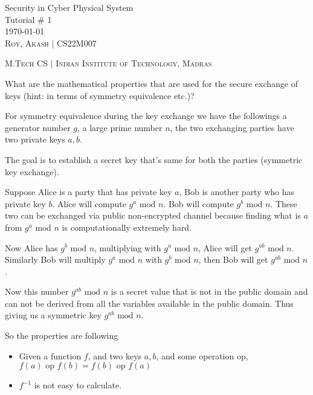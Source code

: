 \documentclass[12pt, a4paper, onecolumn]{exam}
\begin{document}
\begingroup  
    \centering
    \LARGE Security in Cyber Physical System\\
    \LARGE Tutorial \# 1\\[0.5em]
    \large \today\\[0.5em]
    \large \textsc{Roy, Akash} $\mid$ CS22M007\par
    \large \textsc{M.Tech CS} $\mid$ \textsc{Indian Institute of Technology, Madras}\par
\endgroup
\pointsdroppedatright %
\printanswers
\renewcommand{\solutiontitle}{\noindent\textbf{Ans:}\enspace}   %

\begin{questions}

    \question What are the mathematical properties that are used for the secure exchange of keys (hint: in terms of symmetry equivalence etc.)?

    \begin{solution}
        For symmetry equivalence during the key exchange we have the followings a generator number $g$, a large prime number $n$, the two exchanging parties have two private keys $a, b$.

        The goal is to establish a secret key that's same for both the parties (symmetric key exchange).

        Suppose Alice is a party that has private key $a$, Bob is another party who has private key $b$. Alice will compute $g^a \text{ mod } n$. Bob will compute $g^b \text{ mod } n$. These two can be exchanged via public non-encrypted channel because finding what is $a$ from $g^a \text{ mod } n$ is computationally extremely hard.

        Now Alice has $g^b \text{ mod } n$, multiplying with $g^a \text{ mod } n$, Alice will get $g^{ab} \text{ mod } n$. Similarly Bob will multiply $g^a \text{ mod } n$ with $g^b \text{ mod } n$, then Bob will get $g^{ab} \text{ mod } n$.

        Now this number $g^{ab} \text{ mod } n$ is a secret value that is not in the public domain and can not be derived from all the variables available in the public domain. Thus giving us a symmetric key $g^{ab} \text{ mod } n$.

        So the properties are following
        \begin{itemize}
            \item Given a function $f$, and two keys $a, b$, and some operation
            $\text{op}$, $f(a) \text{ op } f(b) = f(b) \text{ op } f(a)$
            \item $f^{-1}$ is not easy to calculate.
        \end{itemize}
        

\end{solution}
\end{questions}
\end{document}
